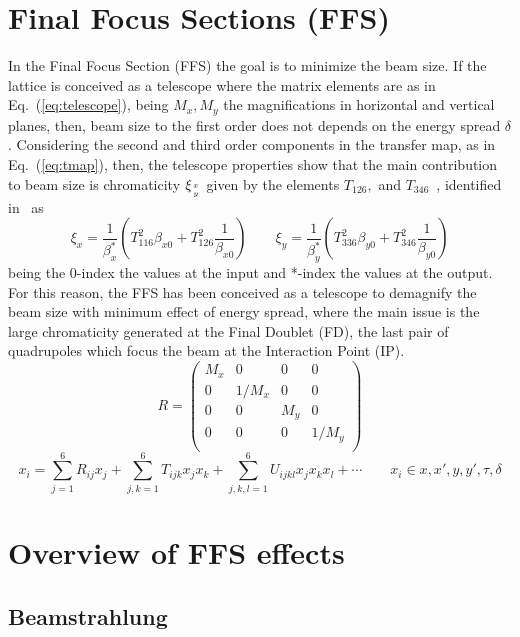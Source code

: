 \section{Final Focus Sections (FFS)}
In the Final Focus Section (FFS) the goal is to minimize the beam size. If the lattice is conceived as a telescope where the matrix elements are as in Eq.~(\ref{eq:telescope}), being $M_x, M_y$ the magnifications in horizontal and vertical planes, then, beam size to the first order does not depends on the energy spread $\delta$. Considering the second and third order components in the transfer map, as in Eq.~(\ref{eq:tmap}), then, the telescope properties show that the main contribution to beam size is chromaticity $\xi_{x\atop y}$ given by the elements $T_{126},$ and $T_{346}$~\cite{Brown:1987}, identified in~\cite{GarciaMorales:1982827} as
\begin{equation}
 \xi_x = \frac{1}{\beta_x^*}\left(T_{116}^2\beta_{x0}+T_{126}^2\frac{1}{\beta_{x0}}\right)\qquad
 \xi_y = \frac{1}{\beta_y^*}\left(T_{336}^2\beta_{y0}+T_{346}^2\frac{1}{\beta_{y0}}\right)
\end{equation}
being the 0-index the values at the input and *-index the values at the output. For this reason, the FFS has been conceived as a telescope to demagnify the beam size with minimum effect of energy spread, where the main issue is the large chromaticity generated at the Final Doublet (FD), the last pair of quadrupoles which focus the beam at the Interaction Point (IP).
\begin{equation}
R=
 \begin{pmatrix}
   M_x & 0 & 0 & 0 \\
   0 & 1/M_x & 0 & 0 \\
   0 & 0 & M_y & 0 \\
   0 & 0 & 0 & 1/M_y \\
  \end{pmatrix}\label{eq:telescope}
\end{equation}
\begin{equation}
x_i=\sum_{j=1}^6R_{ij}x_j+\sum_{j,k=1}^6T_{ijk}x_jx_k+\sum_{j,k,l=1}^6U_{ijkl}x_jx_kx_l+\cdots\qquad x_i\in x,x',y,y',\tau,\delta\label{eq:tmap}
\end{equation}
\section{Overview of FFS effects}
\subsection{Beamstrahlung}
